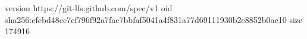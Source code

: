 version https://git-lfs.github.com/spec/v1
oid sha256:cfebd48cc7ef796f92a7fac7bbfaf5041a4f831a77d69111930b2e8852b0ac10
size 174916
